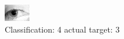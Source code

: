 \begin{figure}[h!]
\begin{center}
\includegraphics[width=0.60\columnwidth]{figures/ID1273_class_4_target_3.png}
\end{center}
\caption{ Classification: 4 actual target: 3}
\label{fig:ID1273_class_4_target_3}
\end{figure}
